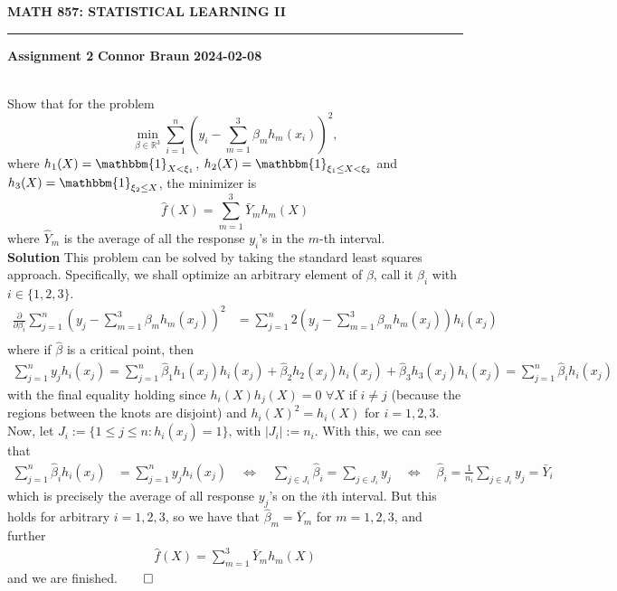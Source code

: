 \documentclass[10pt]{article}
\newcommand{\bp}[1]{\left({#1}\right)}
\newcommand{\mbb}[1]{\mathbb{#1}}
\newcommand{\1}[1]{\mathbbm{1}_{#1}}
\begin{document}
    \begin{center}
        {\bf\large{MATH 857: STATISTICAL LEARNING II}}
        \smallskip
        \hrule
        \smallskip
        {\bf Assignment 2} \hfill {\bf Connor Braun} \hfill {\bf 2024-02-08}
    \end{center}
    \\[5pt]
    Show that for the problem 
    \[\min_{\beta\in\mbb{R}^3}\sum_{i=1}^n\bp{y_i-\sum_{m=1}^3\beta_mh_m(x_i)}^2,\]
    where $h_1(X)=\1{X<\xi_1}$, $h_2(X)=\1{\xi_1\leq X<\xi_2}$ and $h_3(X)=\1{\xi_2\leq X}$, the minimizer is
    \[\hat{f}(X)=\sum_{m=1}^3\bar{Y}_mh_m(X)\]
    where $\hat{Y}_m$ is the average of all the response $y_i$'s in the $m$-th interval.\\[5pt]
    {\bf Solution}\hspace{5pt} This problem can be solved by taking the standard least squares approach. Specifically, we shall optimize an arbitrary element of $\beta$, call it
    $\beta_i$ with $i\in\{1,2,3\}$.
    \begin{align*}
        \frac{\partial}{\partial\beta_i}\sum_{j=1}^n\bp{y_j-\sum_{m=1}^3\beta_mh_m(x_j)}^2&=\sum_{j=1}^n2\bp{y_j-\sum_{m=1}^3\beta_mh_m(x_j)}h_{i}(x_j)\\
    \end{align*} 
    where if $\hat{\beta}$ is a critical point, then
    \begin{align*}
        \sum_{j=1}^ny_jh_i(x_j)=\sum_{j=1}^n\hat{\beta}_1h_1(x_j)h_i(x_j)+\hat{\beta}_2h_2(x_j)h_i(x_j)+\hat{\beta}_3h_3(x_j)h_i(x_j)=\sum_{j=1}^n\hat{\beta}_ih_i(x_j)
    \end{align*}
    with the final equality holding since $h_i(X)h_j(X)=0$ $\forall X$ if $i\neq j$ (because the regions between the knots are disjoint) and $h_i(X)^2=h_i(X)$ for $i=1,2,3$. Now, let $J_i:=\{1\leq j\leq n: h_i(x_j)=1\}$, with $|J_i|:=n_i$. With this, we can see that
    \begin{align*}
        \sum_{j=1}^n\hat{\beta}_ih_i(x_j)&=\sum_{j=1}^ny_jh_i(x_j)\quad\Leftrightarrow\quad \sum_{j\in J_i}\hat{\beta}_i=\sum_{j\in J_i}y_j\quad\Leftrightarrow\quad \hat{\beta}_i=\frac{1}{n_i}\sum_{j\in J_i}y_j=\bar{Y}_i
    \end{align*}
    which is precisely the average of all response $y_j$'s on the $i$th interval. But this holds for arbitrary $i=1,2,3$, so we have that $\hat{\beta}_m=\bar{Y}_m$ for $m=1,2,3$, and further
    \begin{align*}
        \hat{f}(X)=\sum_{m=1}^3\bar{Y}_mh_m(X)
    \end{align*} 
    and we are finished.\hfill{$\qed$}\\[5pt]
\end{document}
